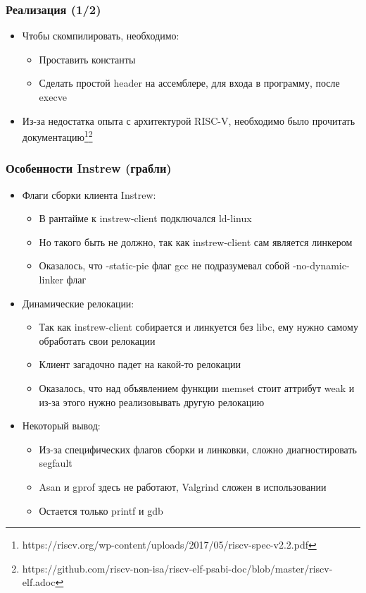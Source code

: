 \documentclass{beamer}
\begin{document}
\begin{frame}[fragile]
  \frametitle{Реализация (1/2)}
  \begin{itemize}
    \item Чтобы скомпилировать, необходимо:
          \begin{itemize}
            \item Проставить константы
            \item Сделать простой header на ассемблере, для входа в программу, после execve
          \end{itemize}
    \item Из-за недостатка опыта с архитектурой RISC-V, необходимо было прочитать документацию\footnote{https://riscv.org/wp-content/uploads/2017/05/riscv-spec-v2.2.pdf}\footnote{https://github.com/riscv-non-isa/riscv-elf-psabi-doc/blob/master/riscv-elf.adoc}
  \end{itemize}
\end{frame}

\begin{frame}[fragile]
  \frametitle{Особенности Instrew (грабли)}
  \begin{itemize}
    \item Флаги сборки клиента Instrew:
          \begin{itemize}
            \item В рантайме к instrew-client подключался ld-linux
            \item Но такого быть не должно, так как instrew-client сам является линкером
            \item Оказалось, что -static-pie флаг gcc не подразумевал собой -no-dynamic-linker флаг
          \end{itemize}
    \item Динамические релокации:
          \begin{itemize}
            \item Так как instrew-client собирается и линкуется без libc, ему нужно самому обработать свои релокации
            \item Клиент загадочно падет на какой-то релокации
            \item Оказалось, что над объявлением функции memset стоит аттрибут weak и из-за этого нужно реализовывать другую релокацию
          \end{itemize}
    \item Некоторый вывод:
          \begin{itemize}
            \item Из-за специфических флагов сборки и линковки, сложно диагностировать segfault
            \item Asan и gprof здесь не работают, Valgrind сложен в использовании
            \item Остается только printf и gdb
          \end{itemize}
  \end{itemize}
\end{frame}
\end{document}
